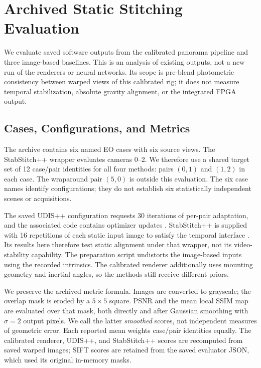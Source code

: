 \section{Archived Static Stitching Evaluation}
\label{sec:legacy-evaluation}
We evaluate saved software outputs from the calibrated panorama pipeline
and three image-based baselines. This is an analysis of existing outputs, not a new run of
the renderers or neural networks. Its scope is pre-blend photometric consistency
between warped views of this calibrated rig; it does not measure temporal
stabilization, absolute gravity alignment, or the integrated FPGA output.

\subsection{Cases, Configurations, and Metrics}
The archive contains six named EO cases with six source views. The StabStitch++ wrapper evaluates cameras 0--2. We therefore use a
shared target set of 12 case/pair identities for all four methods: pairs
$(0,1)$ and $(1,2)$ in each case. The wraparound pair $(5,0)$ is outside this evaluation. The six case names
identify configurations; they do not establish six statistically independent
scenes or acquisitions.

The saved UDIS++ configuration requests 30 iterations of per-pair adaptation,
and the associated code contains optimizer updates \cite{nie2023parallax}.
StabStitch++ is supplied with 16 repetitions of each static input image to
satisfy the temporal interface \cite{nie2025stabstitch2}. Its results here
therefore test static alignment under that wrapper, not its video-stability
capability. The preparation script undistorts the image-based inputs using
the recorded intrinsics. The calibrated renderer additionally uses mounting
geometry and inertial angles, so the methods still receive different priors.

We preserve the archived metric formula. Images are converted to grayscale;
the overlap mask is eroded by a $5\times5$ square. PSNR and the mean local SSIM
map \cite{wang2004ssim} are evaluated over that mask, both directly and after
Gaussian smoothing with $\sigma=2$ output pixels. We call the latter
\emph{smoothed} scores, not independent measures of geometric error. Each
reported mean weights case/pair identities equally. The calibrated renderer,
UDIS++, and StabStitch++ scores are recomputed from saved warped images; SIFT
scores are retained from the saved evaluator JSON, which used its original
in-memory masks.

